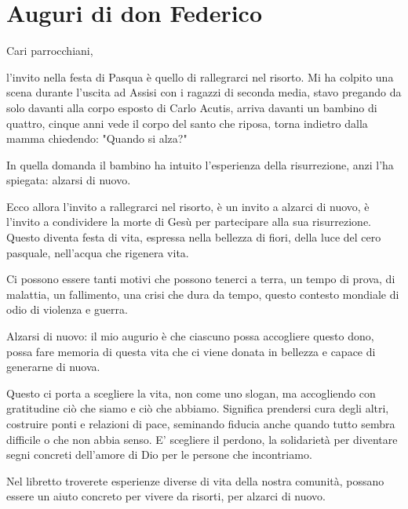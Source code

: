 \section{Auguri di don Federico}

Cari parrocchiani,

l'invito nella festa di Pasqua è quello di rallegrarci nel risorto. Mi ha colpito una scena durante l'uscita ad Assisi con i ragazzi di seconda media, stavo pregando da solo davanti alla corpo esposto di Carlo Acutis, arriva davanti un bambino di quattro, cinque anni vede il corpo del santo che riposa, torna indietro dalla mamma chiedendo: "Quando si alza?"

In quella domanda il bambino ha intuito l'esperienza della risurrezione, anzi l'ha spiegata: alzarsi di nuovo.

Ecco allora l'invito a rallegrarci nel risorto, è un invito a alzarci di nuovo, è l'invito a condividere la morte di Gesù per partecipare alla sua risurrezione. Questo diventa festa di vita, espressa nella bellezza di fiori, della luce del cero pasquale, nell'acqua che rigenera vita.

Ci possono essere tanti motivi che possono tenerci a terra, un tempo di prova, di malattia, un fallimento, una crisi che dura da tempo, questo contesto mondiale di odio di violenza e guerra.

Alzarsi di nuovo: il mio augurio è che ciascuno possa accogliere questo dono, possa fare memoria di questa vita che ci viene donata in bellezza e capace di generarne di nuova.

Questo ci porta a scegliere la vita, non come uno slogan, ma accogliendo con gratitudine ciò che siamo e ciò che abbiamo. Significa prendersi cura degli altri, costruire ponti e relazioni di pace, seminando fiducia anche quando tutto sembra difficile o che non abbia senso. E' scegliere il perdono, la solidarietà per diventare segni concreti dell'amore di Dio per le persone che incontriamo.

Nel libretto troverete esperienze diverse di vita della nostra comunità, possano essere un aiuto concreto per vivere da risorti, per alzarci di nuovo.


